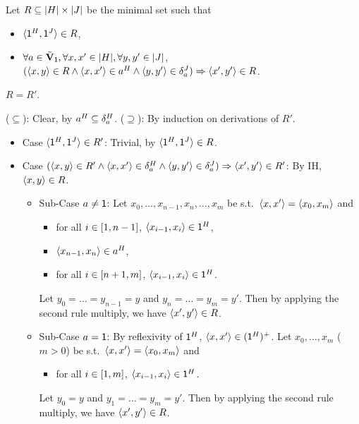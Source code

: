 Let $R \subseteq \domain{\graph[2]} \times \domain{\graph[3]}$ be the minimal set such that
\begin{itemize}
       \item $\tuple{\src^{\graph[2]}, \src^{\graph[3]}} \in R$,
       \item $\forall a \in \tilde{\vsig}_{\id}, \forall x, x' \in \domain{\graph[2]}, \forall y, y' \in \domain{\graph[3]}$,\   $(\tuple{x, y} \in R \land \tuple{x, x'} \in a^{\graph[2]} \land \tuple{y, y'} \in \delta_{a}^{\graph[3]}) \Rightarrow \tuple{x', y'} \in R$.
\end{itemize}
\begin{claim}\label{claim: witness eq}
$R = R'$.
\end{claim}
\begin{claimproof}
($\subseteq$):
Clear, by $a^{\graph[2]} \subseteq \delta_{a}^{\graph[2]}$.
($\supseteq$):
By induction on derivations of $R'$.
\begin{itemize}
\item Case $\tuple{\src^{\graph[2]}, \src^{\graph[3]}} \in R'$:
Trivial, by $\tuple{\src^{\graph[2]}, \src^{\graph[3]}} \in R$.
\item Case $(\tuple{x, y} \in R' \land \tuple{x, x'} \in \delta_{a}^{\graph[2]} \land \tuple{y, y'} \in \delta_{a}^{\graph[3]}) \Rightarrow \tuple{x', y'} \in R'$:
By IH, $\langle x, y\rangle \in R$.
\begin{itemize}
       \item Sub-Case $a \neq \mathsf{1}$:
Let $x_{0}, \dots, x_{n-1}, x_{n}, \dots, x_{m}$ be s.t.\ $\langle x, x'\rangle = \langle x_0, x_m\rangle$ and 
\begin{itemize}
       \item for all $i \in [1, n-1]$,  $\tuple{x_{i-1}, x_{i}} \in \id^{\graph[2]}$,
       \item $\tuple{x_{n-1}, x_{n}} \in a^{\graph[2]}$,
       \item for all $i \in [n+1, m]$,  $\tuple{x_{i-1}, x_{i}} \in \id^{\graph[2]}$.
\end{itemize}
Let $y_0 = \dots = y_{n-1} = y$ and $y_{n} = \dots = y_{m} = y'$.
Then by applying the second rule multiply, we have $\langle x', y'\rangle \in R$. 
       \item Sub-Case $a = \mathsf{1}$:
       By reflexivity of $\id^{\graph[2]}$, $\tuple{x, x'} \in (\id^{\graph[2]})^{+}$.
       Let $x_{0}, \dots, x_{m}$ ($m > 0$) be s.t.\ $\langle x, x'\rangle = \langle x_0, x_m\rangle$ and 
\begin{itemize}
       \item for all $i \in [1, m]$,  $\tuple{x_{i-1}, x_{i}} \in \id^{\graph[2]}$.
\end{itemize}
       Let $y_0 = y$ and $y_{1} = \dots = y_{m} = y'$.
       Then by applying the second rule multiply, we have $\langle x', y'\rangle \in R$. 
       \claimqedhere
\end{itemize}
\end{itemize}
\end{claimproof}
       
